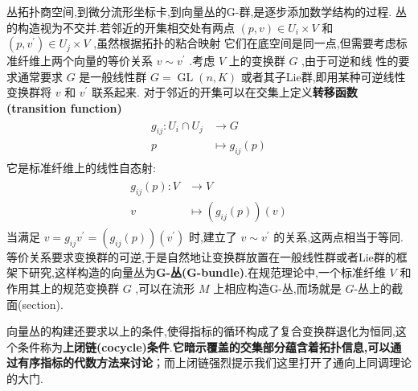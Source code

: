 丛拓扑商空间,到微分流形坐标卡,到向量丛的G-群,是逐步添加数学结构的过程.
丛的构造视为不交并.若邻近的开集相交处有两点 $(p, v) \in U_i \times V$ 和 $\left(p, v^{\prime}\right) \in U_j \times V$ ,虽然根据拓扑的粘合映射 它们在底空间是同一点,但需要考虑标准纤维上两个向量的等价关系 $v \sim v^{\prime}$ .考虑 $V$ 上的变换群 $G$ ,由于可逆和线 性的要求通常要求 $G$ 是一般线性群 $G=\operatorname{GL}(n, K)$ 或者其子Lie群,即用某种可逆线性变换群将 $v$ 和 $v^{\prime}$ 联系起来. 对于邻近的开集可以在交集上定义\textbf{转移函数(transition function)}
\begin{align*}
\begin{aligned}
g_{i j}: U_i \cap U_j & \rightarrow G \\
p & \mapsto g_{i j}(p)
\end{aligned}
\end{align*}
它是标准纤维上的线性自态射:
\begin{align*}
\begin{aligned}
g_{i j}(p): V & \rightarrow V \\
v & \mapsto\left(g_{i j}(p)\right)(v)
\end{aligned}
\end{align*}
当满足 $v=g_{i j} v^{\prime}=\left(g_{i j}(p)\right)\left(v^{\prime}\right)$ 时,建立了 $v \sim v^{\prime}$ 的关系,这两点相当于等同.等价关系要求变换群的可逆,于是自然地让变换群放置在一般线性群或者Lie群的框架下研究,这样构造的向量丛为\textbf{G-丛(G-bundle)}.在规范理论中,一个标准纤维 $V$ 和作用其上的规范变换群 $G$ ,可以在流形 $M$ 上相应构造G-丛,而场就是 $G$-丛上的截面(section).

向量丛的构建还要求以上的条件,使得指标的循环构成了复合变换群退化为恒同,这个条件称为\textbf{上闭链(cocycle)条件}.\textbf{它暗示覆盖的交集部分蕴含着拓扑信息,可以通过有序指标的代数方法来讨论}；而上闭链强烈提示我们这里打开了通向上同调理论的大门.

